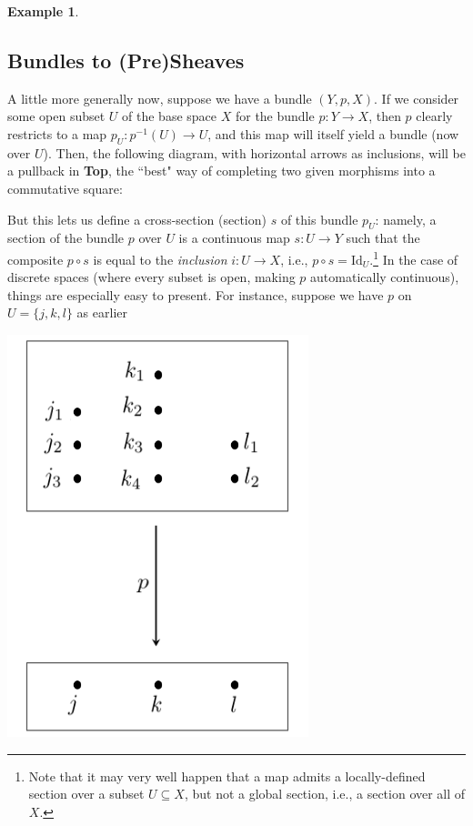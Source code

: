 \documentclass[a4paper]{book}
\theoremstyle{definition}
\newtheorem{example}{Example}[section]
\theoremstyle{definition}
\theoremstyle{definition}
\theoremstyle{theorem}
\theoremstyle{definition}
\begin{document}
\begin{example}
\subsection{Bundles to (Pre)Sheaves}
A little more generally now, suppose we have a bundle $(Y, p, X)$. If we consider some open subset $U$ of the base space $X$ for the bundle $p: Y \rightarrow X$, then $p$ clearly restricts to a map $p_U: p^{-1}(U) \rightarrow U$, and this map will itself yield a bundle (now over $U$). Then, the following diagram, with horizontal arrows as inclusions, will be a pullback in \textbf{Top}, the ``best" way of completing two given morphisms into a commutative square:  
	\begin{center} 
	\end{center} 
But this lets us define a cross-section (section) $s$ of this bundle $p_U$: namely, a section of the bundle $p$ over $U$ is a continuous map $s: U \rightarrow Y$ such that the composite $p \circ s$ is equal to the \textit{inclusion} $i: U \rightarrow X$, i.e., $p \circ s = \text{Id}_U$.\footnote{Note that it may very well happen that a map admits a locally-defined section over a subset $U \subseteq X$, but not a global section, i.e., a section over all of $X$.}
In the case of discrete spaces (where every subset is open, making $p$ automatically continuous), things are especially easy to present. For instance, suppose we have $p$ on $U = \{j,k,l\}$ as earlier 
\begin{center}
	\includegraphics*[scale=0.27]{FiberThingy.png}

\end{center}
\end{example}
\end{document}
